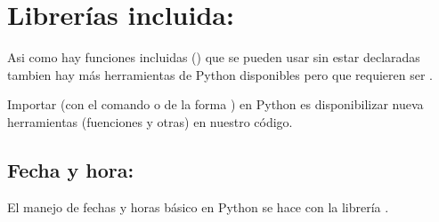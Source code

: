 \documentclass[a4paper,12pt,spanish]{sphinxmanual}
\begin{document}
\begin{sphinxVerbatim}[commandchars=\\\{\}]
  
   \PYG{p}{[}
    \PYG{p}{[}  \PYG{p}{]}
    \PYG{p}{[}   \PYG{p}{]}
    \PYG{p}{[}    \PYG{p}{]}
    \PYG{p}{[}  \PYG{p}{]}
\PYG{p}{]}

  \PYG{p}{[}  \PYG{p}{]}
  
   \PYG{p}{[}\PYG{p}{[}  \PYG{p}{]}\PYG{p}{]}

\end{sphinxVerbatim}

\sphinxstepscope


\chapter{Librerías incluida: }
\label{\detokenize{datetime:librerias-incluida-datetime}}\label{\detokenize{datetime::doc}}
\sphinxAtStartPar
Asi como hay funciones incluidas () que se pueden usar sin
estar declaradas tambien hay más herramientas de Python disponibles pero
que requieren ser .

\sphinxAtStartPar
Importar (con el comando  o de la forma )
en Python es disponibilizar nueva herramientas (fuenciones y otras) en
nuestro código.


\section{Fecha y hora: }
\label{\detokenize{datetime:fecha-y-hora-datetime}}
\sphinxAtStartPar
El manejo de fechas y horas básico en Python se hace con la librería .
\end{document}
